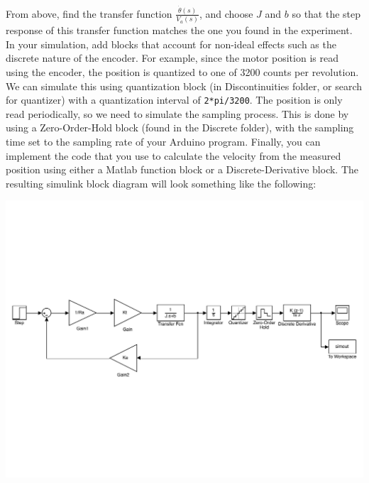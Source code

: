 \begin{itemize}
\begin{center}
{}
\end{center}
From above, find the transfer function $\frac{\dot{\theta}(s)}{V_{a}(s)}$, and choose $J$ and $b$ so that the step response of this transfer function matches the one you found in the experiment. In your simulation, add blocks that account for non-ideal effects such as the discrete nature of the encoder. For example, since the motor position is read using the encoder, the position is quantized to one of 3200 counts per revolution. We can simulate this using quantization block (in \textsf{Discontinuities} folder, or search for quantizer) with a quantization interval of \texttt{2*pi/3200}. The position is only read periodically, so we need to simulate the sampling process. This is done by using a \textsf{Zero-Order-Hold} block (found in the \textsf{Discrete} folder), with the sampling time set to the sampling rate of your Arduino program. Finally, you can implement the code that you use to calculate the velocity from the measured position using either a Matlab function block or a \textsf{Discrete-Derivative} block. The resulting simulink block diagram will look something like the following:
\begin{center}
\includegraphics[width=6in]{figures/motor_simulation}

\end{center}
\end{itemize}

